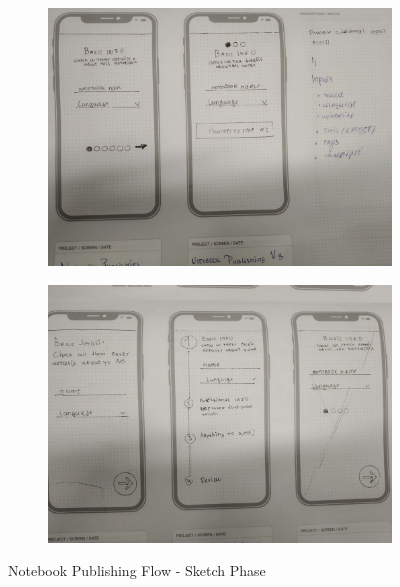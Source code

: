 \documentclass[thesis=B,english]{FITthesis}[2012/10/20]
\begin{document}
\begin{figure}
\begin{subfigure}{.5\textwidth}
  \includegraphics[scale=0.3]{publishing-sketches}
\end{subfigure}%

\begin{subfigure}{.5\textwidth}
  \includegraphics[scale=0.3]{publishing-sketches2}
\end{subfigure}

\caption{Notebook Publishing Flow - Sketch Phase}
\label{fig:publishing-sketches}
\end{figure}
\end{document}
